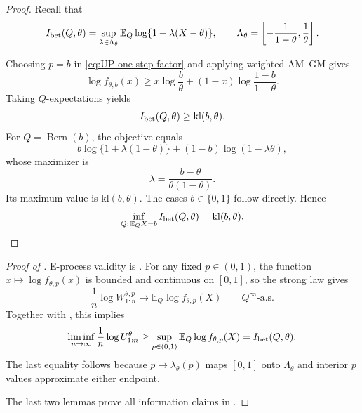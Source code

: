 \documentclass[12pt]{article}
\theoremstyle{spaced}
\theoremstyle{remark}
\newcommand{\E}{\mathbb E}
\newcommand{\kl}{\mathrm{kl}}
\begin{document}
\begin{proof}
Recall that
\[
    I_{\rm bet}(Q,\theta)
    =
    \sup_{\lambda\in\Lambda_\theta}
    \E_Q\log\{1+\lambda(X-\theta)\},
    \qquad
    \Lambda_\theta
    =
    \left[-\frac{1}{1-\theta},\frac{1}{\theta}\right].
\]

Choosing \(p=b\) in \eqref{eq:UP-one-step-factor} and applying weighted
AM--GM gives
\[
    \log f_{\theta,b}(x)
    \ge
    x\log\frac{b}{\theta}
    +(1-x)\log\frac{1-b}{1-\theta}.
\]
Taking \(Q\)-expectations yields
\[
    I_{\rm bet}(Q,\theta)\ge \kl(b,\theta).
\]
For \(Q=\operatorname{Bern}(b)\), the objective equals
\[
    b\log\{1+\lambda(1-\theta)\}
    +(1-b)\log(1-\lambda\theta),
\]
whose maximizer is
\[
    \lambda=\frac{b-\theta}{\theta(1-\theta)}.
\]
Its maximum value is \(\kl(b,\theta)\). The cases \(b\in\{0,1\}\) follow
directly. Hence
\[
    \inf_{Q:\,\E_QX=b}I_{\rm bet}(Q,\theta)=\kl(b,\theta).
\]


\end{proof}




\begin{proof}[Proof of
]
E-process validity is .  For any fixed $p\in(0,1)$, the function
$x\mapsto\log f_{\theta,p}(x)$ is bounded and continuous on $[0,1]$, so the
strong law gives
\[
 \frac1n\log W_{1:n}^{\theta,p}
 \longrightarrow \E_Q\log f_{\theta,p}(X)
 \qquad Q^\infty\text{-a.s.}
\]
Together with , this implies
\[
 \liminf_{n\to\infty}\frac1n\log U_{1:n}^{\theta}
 \ge \sup_{p\in(0,1)}\E_Q\log f_{\theta,p}(X)
 =I_{\rm bet}(Q,\theta).
\]
The last equality follows because $p\mapsto\lambda_\theta(p)$ maps
$[0,1]$ onto $\Lambda_\theta$ and interior $p$ values approximate either
endpoint.

The last two lemmas prove all information claims in
.

\end{proof}
\end{document}

